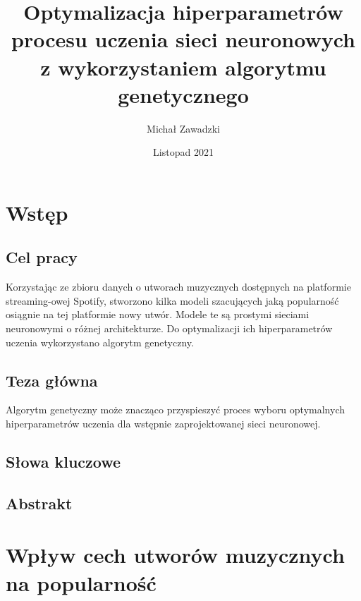 \documentclass[a4paper,11pt]{article}
\title{Optymalizacja hiperparametrów procesu uczenia sieci neuronowych z wykorzystaniem algorytmu genetycznego}
\author{Michał Zawadzki}
\date{Listopad 2021}
\begin{document}
    \maketitle

    \tableofcontents


    \section{Wstęp}

    \subsection{Cel pracy}
    Korzystając ze zbioru danych o utworach muzycznych dostępnych na platformie streaming-owej Spotify, stworzono kilka modeli szacujących jaką popularność osiągnie na tej platformie nowy utwór. Modele te są prostymi sieciami neuronowymi o różnej architekturze. Do optymalizacji ich hiperparametrów uczenia wykorzystano algorytm genetyczny.

    \subsection{Teza główna} %
    Algorytm genetyczny może znacząco przyspieszyć proces wyboru optymalnych hiperparametrów uczenia dla wstępnie zaprojektowanej sieci neuronowej.

    \subsection{Słowa kluczowe} %

    \subsection{Abstrakt} %


    \section{Wpływ cech utworów muzycznych na popularność}
\end{document}
